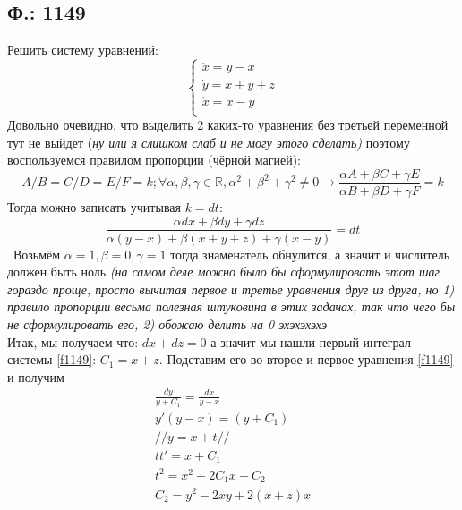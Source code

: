 \documentclass{article}
\begin{document}
\subsection{Ф.: 1149}
Решить систему уравнений:
\begin{equation}\label{f1149}
    \begin{cases}
       \dot{x}=y-x\\
       \dot{y}=x+y+z\\
       \dot{x}=x-y\\
    \end{cases}
\end{equation}
Довольно очевидно, что выделить 2 каких-то уравнения без третьей переменной тут не выйдет  \textcolor[rgb]{0.480469,0.566406,0.480469}{(\textit{ну или я слишком слаб и не могу этого сделать)}} поэтому воспользуемся правилом пропорции (чёрной магией):
\begin{equation*}
A/B=C/D=E/F=k;\forall \alpha, \beta,\gamma \in \mathbb{R}, \alpha^2+\beta^2+\gamma^2 \neq 0 \rightarrow \frac{\alpha A + \beta C + \gamma E}{\alpha B + \beta D + \gamma F}=k                                                 
\end{equation*}
Тогда можно записать учитывая $k=dt$:
\begin{equation*}
    \frac{\alpha dx + \beta dy + \gamma dz}{\alpha (y-x) + \beta (x+y+z) + \gamma (x-y)}=dt                                       
\end{equation*}      \
Возьмём $\alpha=1, \beta=0, \gamma=1$ тогда знаменатель обнулится, а значит и числитель должен быть ноль  \textcolor[rgb]{0.480469,0.566406,0.480469}{\textit{(на самом деле можно было бы сформулировать этот шаг гораздо проще, просто вычитая первое и третье уравнения друг из друга, но 1) правило пропорции весьма полезная штуковина в этих задачах, так что чего бы не сформулировать его, 2) обожаю делить на 0 эхэхэхэхэ}}\\
Итак, мы получаем что: $dx+dz=0$ а значит мы нашли первый интеграл системы \ref{f1149}: $C_1=x+z$. Подставим его во второе и первое уравнения \ref{f1149} и получим 
\begin{gather*}
    \frac{dy}{y+C_1}=\frac{dx}{y-x}\\
    y'(y-x)=(y+C_1) \\
    \text{//} y=x+t \text{//} \\
    tt'=x+C_1  \\
    t^2=x^2+2C_1x+C_2 \\
    C_2=y^2-2xy+2(x+z)x
\end{gather*}
\end{document}
